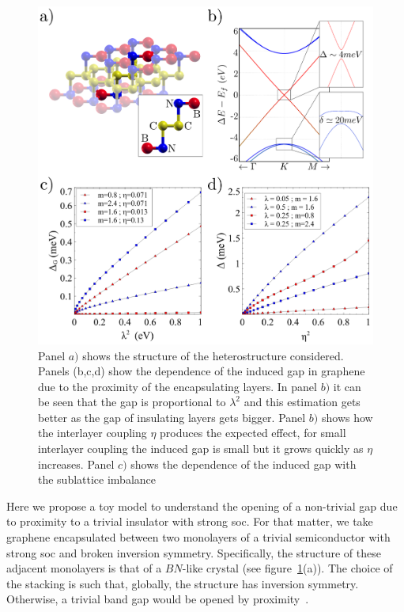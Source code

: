 \begin{figure}[hbt]
 \centering
  \includegraphics{appendix/fig_qsh/encapsulated.png}
\caption{Panel $a)$ shows the structure of the heterostructure considered.
Panels (b,c,d) show the dependence of the induced gap in graphene due to the proximity of the encapsulating layers. In panel $b)$ it can be seen that the gap is proportional to $\lambda^{2}$ and this estimation gets better as the gap of insulating layers gets bigger. Panel $b)$ shows how the interlayer coupling $\eta$ produces the expected effect, for small interlayer coupling the induced gap is small but it grows quickly as $\eta$ increases. Panel $c)$ shows the dependence of the induced gap with the sublattice imbalance}
\label{induced}
\end{figure}

Here we propose a toy model to understand the opening of a non-trivial gap due to proximity to a trivial insulator with strong \ac{soc}.
For that matter, we take graphene encapsulated between two monolayers of a trivial semiconductor with strong \ac{soc} and broken inversion symmetry.   Specifically, the structure of  these adjacent monolayers is that of a $BN$-like crystal (see figure~\ref{induced}(a)).   The choice of the stacking is such that, globally, the structure has inversion symmetry. Otherwise,  a trivial band gap would be opened by proximity~\cite{Giovannetti2007}.

